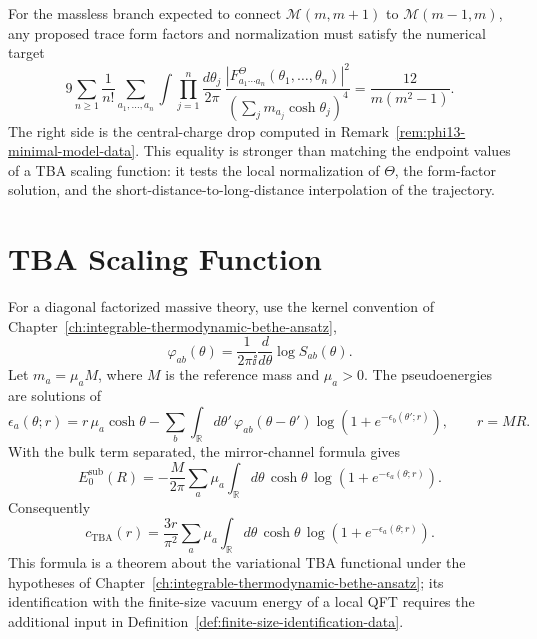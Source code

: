 \begin{example}
\label{ex:phi13-trace-sum-rule-target}
For the massless branch expected to connect
\(\mathcal M(m,m+1)\) to \(\mathcal M(m-1,m)\), any proposed trace form
factors and normalization must satisfy the numerical target
\[
  9
  \sum_{n\geq1}\frac1{n!}
  \sum_{a_1,\ldots,a_n}
  \int\prod_{j=1}^n\frac{d\theta_j}{2\pi}\,
  \frac{|F^\Theta_{a_1\cdots a_n}(\theta_1,\ldots,\theta_n)|^2}
  {(\sum_j m_{a_j}\cosh\theta_j)^4}
  =
  \frac{12}{m(m^2-1)} .
\]
The right side is the central-charge drop computed in
Remark~\ref{rem:phi13-minimal-model-data}.  This equality is stronger
than matching the endpoint values of a TBA scaling function: it tests the
local normalization of \(\Theta\), the form-factor solution, and the
short-distance-to-long-distance interpolation of the trajectory.
\end{example}

\section{TBA Scaling Function}

For a diagonal factorized massive theory, use the kernel convention of
Chapter~\ref{ch:integrable-thermodynamic-bethe-ansatz},
\[
  \varphi_{ab}(\theta)
  =
  \frac{1}{2\pi\ii}\frac{d}{d\theta}\log S_{ab}(\theta).
\]
Let \(m_a=\mu_a M\), where \(M\) is the reference mass and
\(\mu_a>0\).  The pseudoenergies are solutions of
\[
  \epsilon_a(\theta;r)
  =
  r\,\mu_a\cosh\theta
  -\sum_b\int_{\mathbb R}d\theta'\,
  \varphi_{ab}(\theta-\theta')
  \log\!\left(1+e^{-\epsilon_b(\theta';r)}\right),
  \qquad r=MR .
\]
With the bulk term separated, the mirror-channel formula gives
\[
  E_0^{\mathrm{sub}}(R)
  =
  -\frac{M}{2\pi}
  \sum_a\mu_a\int_{\mathbb R}d\theta\,
  \cosh\theta\,
  \log\!\left(1+e^{-\epsilon_a(\theta;r)}\right).
\]
Consequently
\[
  c_{\mathrm{TBA}}(r)
  =
  \frac{3r}{\pi^2}
  \sum_a\mu_a\int_{\mathbb R}d\theta\,
  \cosh\theta\,
  \log\!\left(1+e^{-\epsilon_a(\theta;r)}\right).
\]
This formula is a theorem about the variational TBA functional under the
hypotheses of Chapter~\ref{ch:integrable-thermodynamic-bethe-ansatz}; its
identification with the finite-size vacuum energy of a local QFT requires the
additional input in Definition~\ref{def:finite-size-identification-data}.

